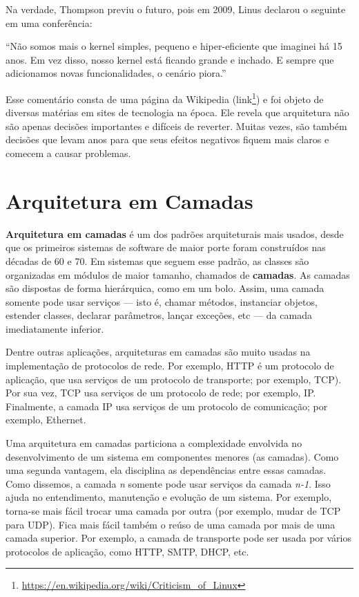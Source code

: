 \documentclass[
  11pt,
  twoside]{book}
\DeclareRobustCommand{\href}[2]{#2\footnote{\url{#1}}}
\renewenvironment{quote}{\centering \vspace{1.5ex} \begin{tcolorbox}[colback=backcolor, width=4.9in]}{\end{tcolorbox}}
\begin{document}
Na verdade, Thompson previu o futuro, pois em 2009, Linus declarou o
seguinte em uma conferência:

\begin{quote}
``Não somos mais o kernel simples, pequeno e hiper-eficiente que
imaginei há 15 anos. Em vez disso, nosso kernel está ficando grande e
inchado. E sempre que adicionamos novas funcionalidades, o cenário
piora.''
\end{quote}

Esse comentário consta de uma página da Wikipedia
(\href{https://en.wikipedia.org/wiki/Criticism_of_Linux}{link}) e foi
objeto de diversas matérias em sites de tecnologia na época. Ele revela
que arquitetura não são apenas decisões importantes e difíceis de
reverter. Muitas vezes, são também decisões que levam anos para que seus
efeitos negativos fiquem mais claros e comecem a causar problemas.

\hypertarget{arquitetura-em-camadas}{%
\section{Arquitetura em Camadas}\label{arquitetura-em-camadas}}


\textbf{Arquitetura em camadas} é um dos padrões arquiteturais mais
usados, desde que os primeiros sistemas de software de maior porte foram
construídos nas décadas de 60 e 70. Em sistemas que seguem esse padrão,
as classes são organizadas em módulos de maior tamanho, chamados de
\textbf{camadas}. As camadas são dispostas de forma hierárquica, como em
um bolo. Assim, uma camada somente pode usar serviços --- isto é, chamar
métodos, instanciar objetos, estender classes, declarar parâmetros,
lançar exceções, etc --- da camada imediatamente inferior.

Dentre outras aplicações, arquiteturas em camadas são muito usadas na
implementação de protocolos de rede. Por exemplo, HTTP é um protocolo de
aplicação, que usa serviços de um protocolo de transporte; por exemplo,
TCP). Por sua vez, TCP usa serviços de um protocolo de rede; por
exemplo, IP. Finalmente, a camada IP usa serviços de um protocolo de
comunicação; por exemplo, Ethernet.

Uma arquitetura em camadas particiona a complexidade envolvida no
desenvolvimento de um sistema em componentes menores (as camadas). Como
uma segunda vantagem, ela disciplina as dependências entre essas
camadas. Como dissemos, a camada \emph{n} somente pode usar serviços da
camada \emph{n-1}. Isso ajuda no entendimento, manutenção e evolução de
um sistema. Por exemplo, torna-se mais fácil trocar uma camada por outra
(por exemplo, mudar de TCP para UDP). Fica mais fácil também o reúso de
uma camada por mais de uma camada superior. Por exemplo, a camada de
transporte pode ser usada por vários protocolos de aplicação, como HTTP,
SMTP, DHCP, etc.
\end{document}
